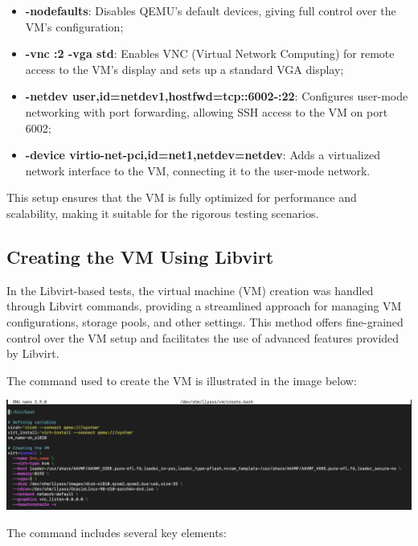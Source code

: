 \begin{itemize}
    \item \textbf{-nodefaults}: Disables QEMU’s default devices, giving full control over the VM’s configuration;
    \item \textbf{-vnc :2 -vga std}: Enables VNC (Virtual Network Computing) for remote access to the VM’s display and sets up a standard VGA display;
    \item \textbf{-netdev user,id=netdev1,hostfwd=tcp::6002-:22}: Configures user-mode networking with port forwarding, allowing SSH access to the VM on port 6002;
    \item \textbf{-device virtio-net-pci,id=net1,netdev=netdev}: Adds a virtualized network interface to the VM, connecting it to the user-mode network.
\end{itemize}

This setup ensures that the VM is fully optimized for performance and scalability, making it suitable for the rigorous testing scenarios.

\subsection{Creating the VM Using Libvirt}

In the Libvirt-based tests, the virtual machine (VM) creation was handled through Libvirt commands, providing a streamlined approach for managing VM configurations, storage pools, and other settings. This method offers fine-grained control over the VM setup and facilitates the use of advanced features provided by Libvirt.\mynewline

The command used to create the VM is illustrated in the image below:

\begin{center}
    \centering
    \includegraphics[width=\textwidth]{Images/VM Cration Using Libvirt.png}
    \label{fig}
\end{center}

The command includes several key elements:

